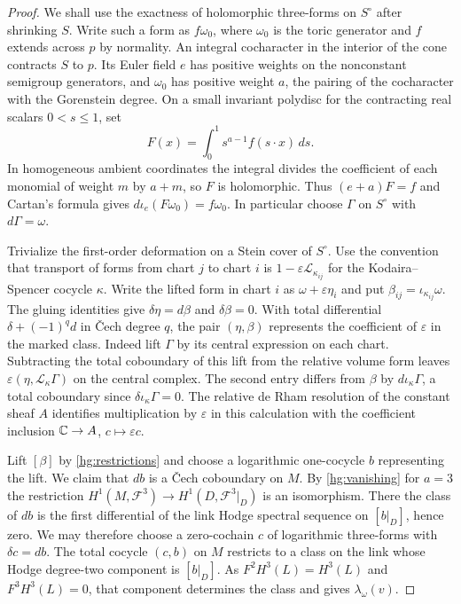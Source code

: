 \begin{proof}
We shall use the exactness of holomorphic three-forms on $S^\circ$
after shrinking $S$. Write such a form as $f\omega_0$, where $\omega_0$
is the toric generator and $f$ extends across $p$ by normality.
An integral cocharacter in the interior of the cone contracts $S$ to
$p$. Its Euler field $e$ has positive weights on the nonconstant
semigroup generators, and $\omega_0$ has positive weight $a$, the
pairing of the cocharacter with the Gorenstein degree. On a small
invariant polydisc for the contracting real scalars $0<s\leq1$, set
\[
 F(x)=\int_0^1 s^{a-1} f(s\cdot x)\,ds .
\]
In homogeneous ambient coordinates the integral divides the coefficient
of each monomial of weight $m$ by $a+m$, so $F$ is holomorphic. Thus
$(e+a)F=f$ and Cartan's formula gives
$d\iota_e(F\omega_0)=f\omega_0$. In particular choose
$\Gamma$ on $S^\circ$ with $d\Gamma=\omega$.

Trivialize the first-order deformation on a Stein cover of $S^\circ$.
Use the convention that transport of forms from chart $j$ to chart $i$
is $1-\varepsilon\mathcal L_{\kappa_{ij}}$ for the
Kodaira--Spencer cocycle $\kappa$. Write the lifted form in chart $i$
as $\omega+\varepsilon\eta_i$ and put
$\beta_{ij}=\iota_{\kappa_{ij}}\omega$. The gluing identities give
$\delta\eta=d\beta$ and $\delta\beta=0$. With total differential
$\delta+(-1)^q d$ in \v Cech degree $q$, the pair $(\eta,\beta)$
represents the coefficient of $\varepsilon$ in the marked class.
Indeed lift $\Gamma$ by its central expression on each chart.
Subtracting the total coboundary of this lift from the relative volume
form leaves $\varepsilon(\eta,\mathcal L_\kappa\Gamma)$ on the central
complex. The second entry differs from $\beta$ by
$d\iota_\kappa\Gamma$, a total coboundary since
$\delta\iota_\kappa\Gamma=0$. The relative de Rham resolution of the
constant sheaf $A$ identifies multiplication by $\varepsilon$ in this
calculation with the coefficient inclusion $\mathbb C\to A$,
$c\mapsto\varepsilon c$.

Lift $[\beta]$ by \eqref{hg:restrictions} and choose a logarithmic
one-cocycle $b$ representing the lift. We claim that $db$ is a
\v Cech coboundary on $M$. By \eqref{hg:vanishing} for $a=3$ the
restriction
$H^1(M,\mathcal F^3)\to H^1(D,\mathcal F^3|_D)$ is an
isomorphism. There the class of $db$ is the first differential of
the link Hodge spectral sequence on $[b|_D]$, hence zero. We may
therefore choose a zero-cochain $c$ of logarithmic three-forms with
$\delta c=db$. The total cocycle $(c,b)$ on $M$ restricts to a
class on the link whose Hodge degree-two component is $[b|_D]$.
As $F^2H^3(L)=H^3(L)$ and $F^3H^3(L)=0$, that component determines
the class and gives $\lambda_\omega(v)$.


\end{proof}
